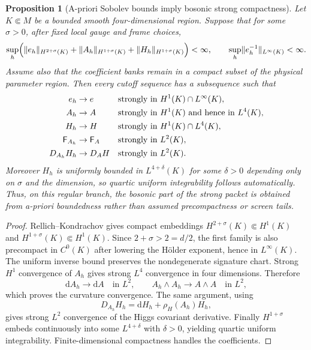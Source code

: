 \documentclass[11pt]{article}
\numberwithin{equation}{section}
\newtheorem{proposition}[proposition]{Proposition}
\theoremstyle{definition}
\theoremstyle{remark}
\newcommand{\dd}{\mathrm d}
\newcommand{\norm}[1]{\lVert#1\rVert}
\newcommand{\Fcurv}{\mathsf F}
\begin{document}
\begin{proposition}[A-priori Sobolev bounds imply bosonic strong compactness]
\label{prop:sobolev-bosonic}
Let $K\Subset M$ be a bounded smooth four-dimensional region. Suppose that for some $\sigma>0$, after fixed local gauge and frame choices,
\begin{equation}
 \sup_h\Bigl(
 \norm{e_h}_{H^{2+\sigma}(K)}
 +\norm{A_h}_{H^{1+\sigma}(K)}
 +\norm{H_h}_{H^{1+\sigma}(K)}
 \Bigr)<\infty,
 \qquad
 \sup_h\norm{e_h^{-1}}_{L^\infty(K)}<\infty.
 \label{eq:apriori-bosonic}
\end{equation}
Assume also that the coefficient banks remain in a compact subset of the physical parameter region. Then every cutoff sequence has a subsequence such that
\begin{align}
 e_h&\to e &&\text{strongly in }H^1(K)\cap L^\infty(K),\notag\\
 A_h&\to A &&\text{strongly in }H^1(K)\text{ and hence in }L^4(K),\notag\\
 H_h&\to H &&\text{strongly in }H^1(K)\cap L^4(K),\notag\\
 \Fcurv_{A_h}&\to\Fcurv_A &&\text{strongly in }L^2(K),\notag\\
 D_{A_h}H_h&\to D_AH &&\text{strongly in }L^2(K).
 \label{eq:apriori-bosonic-convergence}
\end{align}
Moreover $H_h$ is uniformly bounded in $L^{4+\delta}(K)$ for some $\delta>0$ depending only on $\sigma$ and the dimension, so quartic uniform integrability follows automatically. Thus, on this regular branch, the bosonic part of the strong packet is obtained from a-priori boundedness rather than assumed precompactness or screen tails.
\end{proposition}
\begin{proof}
Rellich--Kondrachov gives compact embeddings $H^{2+\sigma}(K)\Subset H^1(K)$ and $H^{1+\sigma}(K)\Subset H^1(K)$. Since $2+\sigma>2=d/2$, the first family is also precompact in $C^0(K)$ after lowering the H\"older exponent, hence in $L^\infty(K)$. The uniform inverse bound preserves the nondegenerate signature chart. Strong $H^1$ convergence of $A_h$ gives strong $L^4$ convergence in four dimensions. Therefore
\[
 \dd A_h\to\dd A\quad\text{in }L^2,
 \qquad
 A_h\wedge A_h\to A\wedge A\quad\text{in }L^2,
\]
which proves the curvature convergence. The same argument, using
\[
 D_{A_h}H_h=\dd H_h+\rho_H(A_h)H_h,
\]
gives strong $L^2$ convergence of the Higgs covariant derivative. Finally $H^{1+\sigma}$ embeds continuously into some $L^{4+\delta}$ with $\delta>0$, yielding quartic uniform integrability. Finite-dimensional compactness handles the coefficients.
\end{proof}
\end{document}
